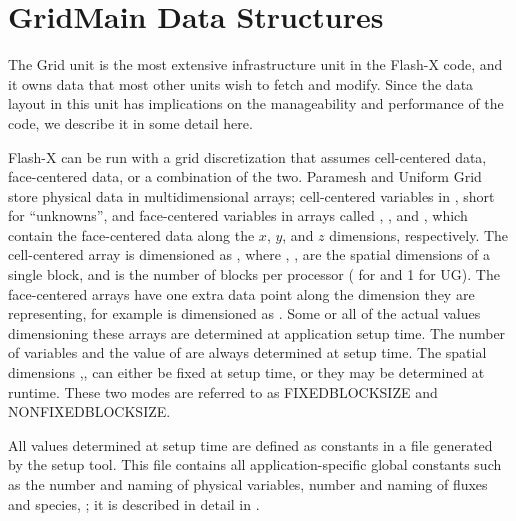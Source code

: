 \section{\unit{GridMain} Data Structures}
The \unit{Grid} unit is the most extensive infrastructure unit in the
Flash-X code, and it owns data that most other units wish to fetch and
modify. Since the data layout in this unit has implications on the
manageability and performance of the code, we describe it in some
detail here. 


Flash-X can be run with a grid discretization that assumes cell-centered data,
face-centered data, or a combination of the two. Paramesh and Uniform
Grid store physical data in multidimensional  arrays;
cell-centered variables in , short for ``unknowns'', and 
face-centered variables in arrays 
called , , and ,
which contain the face-centered data along the
$x$, $y$, and $z$
dimensions, respectively. The cell-centered array  is dimensioned as
,
 where , ,  are the spatial dimensions
of a single block, and  is the number of blocks per
processor ( for \Paramesh and 1 for UG). The
face-centered arrays have one extra data point along the dimension
they are representing, for example  is dimensioned as
. 
 Some or all of the  actual values dimensioning these arrays are
determined at application setup time. The number of variables and the
value of  are always determined at setup time. The
spatial dimensions ,, can either be
fixed at setup time, or they may be determined at runtime. These two
modes are referred to as FIXEDBLOCKSIZE and
NONFIXEDBLOCKSIZE. 

All values determined at setup time are defined as constants in
a file  generated by the setup tool. This file contains
all application-specific global constants such as the number and
naming of physical variables, number and naming of fluxes and species,
\etc; it is described in detail in .

